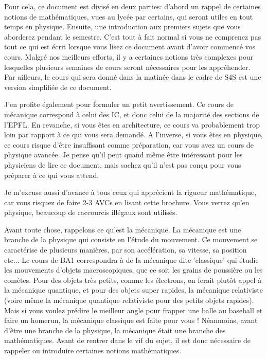 \documentclass{article}
\begin{document}
Pour cela, ce document est divisé en deux parties: d'abord un rappel de certaines notions de mathématiques, vues au lycée par certains, qui seront utiles en tout temps en physique. Ensuite, une introduction aux premiers sujets que vous aborderez pendant le semestre. C'est tout à fait normal si vous ne comprenez pas tout ce qui est écrit lorsque vous lisez ce document avant d'avoir commencé vos cours. Malgré nos meilleurs efforts, il y a certaines notions très complexes pour lesquelles plusieurs semaines de cours seront nécessaires pour les appréhender. Par ailleurs, le cours qui sera donné dans la matinée dans le cadre de S4S est une version simplifiée de ce document. 

J'en profite également pour formuler un petit avertissement. Ce cours de mécanique correspond à celui des IC, et donc celui de la majorité des sections de l'EPFL. En revanche, si vous êtes en architecture, ce cours va probablement trop loin par rapport à ce qui vous sera demandé. A l'inverse, si vous êtes en physique, ce cours risque d'être insuffisant comme préparation, car vous avez un cours de physique avancée. Je pense qu'il peut quand même être intéressant pour les physiciens de lire ce document, mais sachez qu'il n'est pas conçu pour vous préparer à ce qui vous attend. 

Je m'excuse aussi d'avance à tous ceux qui apprécient la rigueur mathématique, car vous risquez de faire 2-3 AVCs en lisant cette brochure. Vous verrez qu'en physique, beaucoup de raccourcis illégaux sont utilisés.


\newpage
\tableofcontents
\newpage
{}

Avant toute chose, rappelons ce qu'est la mécanique. La mécanique est une branche de la physique qui consiste en l'étude du mouvement. Ce mouvement se caractérise de plusieurs manières, par son accélération, sa vitesse, sa position etc...  Le cours de BA1 correspondra à de la mécanique dite 'classique' qui étudie les mouvements d'objets macroscopiques, que ce soit les grains de poussière ou les comètes. Pour des objets très petits, comme les électrons, on ferait plutôt appel à la mécanique quantique, et pour des objets super rapides, la mécanique relativiste (voire même la mécanique quantique relativiste pour des petits objets rapides). Mais si vous voulez prédire le meilleur angle pour frapper une balle au baseball et faire un homerun, la mécanique classique est faite pour vous ! Néanmoins, avant d'être une branche de la physique, la mécanique était une branche des mathématiques. Avant de rentrer dans le vif du sujet, il est donc nécessaire de rappeler ou introduire certaines notions mathématiques.
\end{document}
